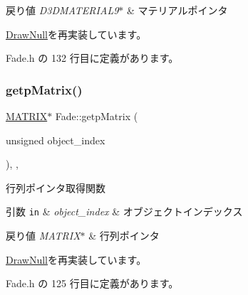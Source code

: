 \begin{DoxyRetVals}{戻り値}
{\em D3\+D\+M\+A\+T\+E\+R\+I\+A\+L9$\ast$} & マテリアルポインタ \\
\hline
\end{DoxyRetVals}


\mbox{\hyperlink{class_draw_null_a0c1efe55fea325ad277594be6fe1e938}{Draw\+Null}}を再実装しています。



 Fade.\+h の 132 行目に定義があります。

\mbox{\label{class_fade_a2e41a31f9801476e63d2082804375e96}} 
\subsubsection{\texorpdfstring{getp\+Matrix()}{getpMatrix()}}
{\footnotesize\ttfamily \mbox{\hyperlink{_vector3_d_8h_a032295cd9fb1b711757c90667278e744}{M\+A\+T\+R\+IX}}$\ast$ Fade\+::getp\+Matrix (\begin{DoxyParamCaption}\item[{unsigned}]{object\+\_\+index }\end{DoxyParamCaption})\hspace{0.3cm}{\ttfamily [inline]}, {\ttfamily [override]}, {\ttfamily [virtual]}}



行列ポインタ取得関数 


\begin{DoxyParams}[1]{引数}
\mbox{\tt in}  & {\em object\+\_\+index} & オブジェクトインデックス \\
\hline
\end{DoxyParams}

\begin{DoxyRetVals}{戻り値}
{\em M\+A\+T\+R\+I\+X$\ast$} & 行列ポインタ \\
\hline
\end{DoxyRetVals}


\mbox{\hyperlink{class_draw_null_a9aac059eb3b5d1f77e8bd3aa0647cff9}{Draw\+Null}}を再実装しています。



 Fade.\+h の 125 行目に定義があります。

\mbox{\label{class_fade_aeb41dfcadf75dd4c980da68e243cc310}} 
